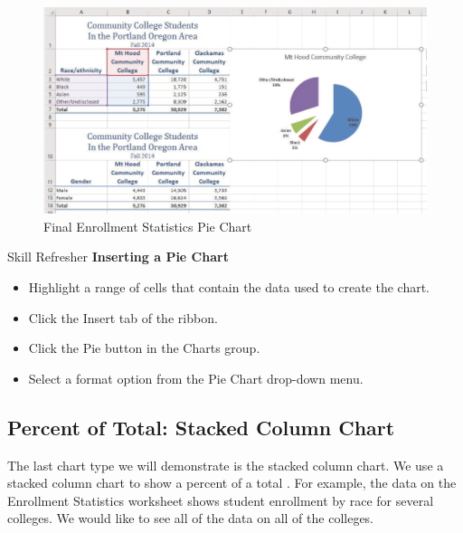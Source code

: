 \begin{figure}[H]
	\centering
	\includegraphics[width=\maxwidth{.95\linewidth}]{gfx/ch04_fig22}
	\caption{Final Enrollment Statistics Pie Chart}
	\label{04:fig22}
\end{figure}

\begin{center}
	\begin{sklbox}{Skill Refresher}
		\textbf{Inserting a Pie Chart}
		\\
		\begin{itemize}
			\setlength{\itemsep}{0pt}
			\setlength{\parskip}{0pt}
			\setlength{\parsep}{0pt}

			\item Highlight a range of cells that contain the data used to create the chart.
			\item Click the Insert tab of the ribbon.
			\item Click the Pie button in the Charts group.
			\item Select a format option from the Pie Chart drop-down menu.
			
		\end{itemize}
	\end{sklbox}
\end{center}

\subsection{Percent of Total: Stacked Column Chart}

The last chart type we will demonstrate is the stacked column chart. We use a stacked column chart to
show a percent of a total . For example, the data on the Enrollment Statistics worksheet shows student
enrollment by race for several colleges. We would like to see all of the data on all of the colleges.

